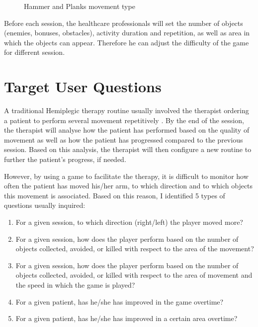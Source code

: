 
\begin{figure}%
    \centering
    \qquad
    \caption{Hammer and Planks movement type}%
    \label{fig:movement_type}%
\end{figure}


Before each session, the healthcare professionals will set the number of objects (enemies, bonuses, obstacles), activity duration and repetition, as well as area in which the objects can appear. Therefore he can adjust the difficulty of the game for different session.


\section{Target User Questions}

A traditional Hemiplegic therapy routine usually involved the therapist ordering a patient to perform several movement repetitively \cite{rahman}. By the end of the session, the therapist will analyse how the patient has performed based on the quality of movement as well as how the patient has progressed compared to the previous session. Based on this analysis, the therapist will then configure a new routine to further the patient's progress, if needed.

However, by using a game to facilitate the therapy, it is difficult to monitor how often the patient has moved his/her arm, to which direction and to which objects this movement is associated. Based on this reason, I identified 5 types of questions usually inquired:

\newcommand{\subscript}[2]{$#1 _ #2$}	
\begin{enumerate}[label=(\subscript{Q}{\arabic*})]
\item For a given session, to which direction (right/left) the player moved more? \label{q1}
\item For a given session, how does the player perform based on the number of objects collected, avoided, or killed with respect to the area of the movement?\label{q2}
\item For a given session, how does the player perform based on the number of objects collected, avoided, or killed with respect to the area of movement and the speed in which the game is played?\label{q3}
\item For a given patient, has he/she has improved in the game overtime?\label{q4}
\item For a given patient, has he/she has improved in a certain area overtime?\label{q5}
\end{enumerate}

